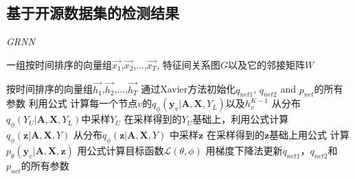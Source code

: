 \subsection{基于开源数据集的检测结果}
\begin{algorithm}[!h]
    \caption{\emph{GRNN}}
    \label{alg}
    \begin{algorithmic}[1]
      \Require
        一组按时间排序的向量组$\vec{x_1}$,$\vec{x_2}$,...,$\vec{x_T}$, 特征间关系图$G$以及它的邻接矩阵$W$

      \Ensure
        按时间排序的向量组$\vec{h_1}$,$\vec{h_2}$,...,$\vec{h_T}$
      \State 通过Xavier方法初始化$q_{net1}$, $q_{net2}$ and $p_{net}$的所有参数
          \State 利用公式 计算每一个节点$v$的$q_\phi(\bm{y}_v | \bm{A}, \bm{X}, Y_L)$以及$h_v^{K-1}$
          \State 从分布$q_\phi(Y_U | \bm{A}, \bm{X}, Y_L)$中采样$Y_U$
          \State 在采样得到的$Y_U$基础上，利用公式计算$q_\phi(\bm{z}| \bm{A}, \bm{X}, Y)$ 
           \State 从分布$q_\phi(\bm{z}| \bm{A}, \bm{X}, Y)$ 中采样$\bm{z}$
           \State 在采样得到的$\bm{z}$基础上用公式 计算$p_{\theta}(\bm{y}_v|\bm{A}, \bm{X}, \bm{z})$
           \EndFor
          \EndFor
          \State 用公式计算目标函数$\mathcal{L}(\theta, \phi)$ 
          \State 用梯度下降法更新$q_{net1}$，$q_{net2}$和$p_{net}$的所有参数
      \EndWhile
    \end{algorithmic}
  \end{algorithm}





